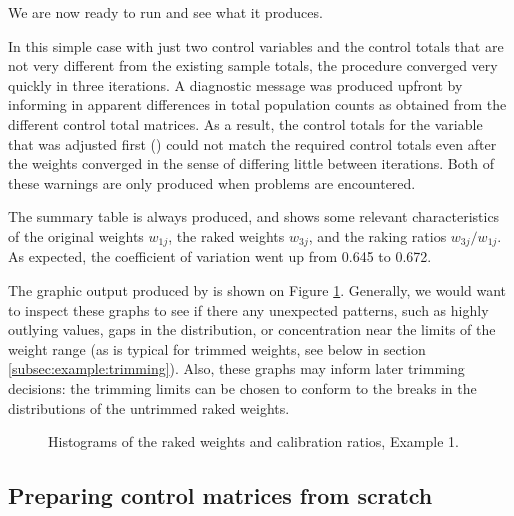 \begin{stexample}[Example 1]
We are now ready to run  and see what it produces.

\begin{stlog}
\nullskip
\end{stlog}

In this simple case with just two control variables
and the control totals that are not very different from the
existing sample totals, the procedure converged very quickly
in three iterations. A diagnostic message was produced upfront
by  informing in apparent differences in
total population counts as obtained from the different
control total matrices. As a result, the control totals
for the variable that was adjusted first ()
could not match the required control totals even after the
weights converged in the sense of differing little between
iterations. Both of these warnings are only produced when
problems are encountered.

The summary table is always produced, and shows some relevant
characteristics of the original weights $w_{1j}$, the raked weights
$w_{3j}$, and the raking ratios $w_{3j}/w_{1j}$. As expected,
the coefficient of variation went up from 0.645 to 0.672.

The graphic output produced by  is shown on
Figure \ref{fig:example1}. Generally, we would want to inspect these
graphs to see if there any unexpected patterns, such as highly outlying values,
gaps in the distribution, or concentration near the limits of the
weight range (as is typical for trimmed weights, see below in section
\ref{subsec:example:trimming}). Also, these graphs
may inform later trimming decisions: the trimming limits can be
chosen to conform to the breaks in the distributions of
the untrimmed raked weights.

\begin{figure}[h!]
\begin{center}
\end{center}
\caption{Histograms of the raked weights and calibration ratios, Example 1.}
\label{fig:example1}
\end{figure}

\end{stexample}

\subsection{Preparing control matrices from scratch}
\label{subsec:acs}

